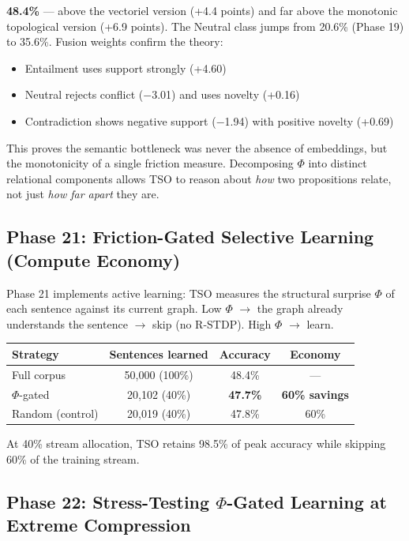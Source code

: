 \documentclass{article}
\begin{document}
\textbf{48.4\%} --- above the vectoriel version (+4.4 points) and far above the monotonic topological version (+6.9 points). The Neutral class jumps from 20.6\% (Phase 19) to 35.6\%. Fusion weights confirm the theory:

\begin{itemize}
    \item Entailment uses support strongly (+4.60)
    \item Neutral rejects conflict ($-$3.01) and uses novelty (+0.16)
    \item Contradiction shows negative support ($-$1.94) with positive novelty (+0.69)
\end{itemize}

This proves the semantic bottleneck was never the absence of embeddings, but the monotonicity of a single friction measure. Decomposing $\Phi$ into distinct relational components allows TSO to reason about \textit{how} two propositions relate, not just \textit{how far apart} they are.

\subsection{Phase 21: Friction-Gated Selective Learning (Compute Economy)}

Phase 21 implements active learning: TSO measures the structural surprise $\Phi$ of each sentence against its current graph. Low $\Phi$ $\to$ the graph already understands the sentence $\to$ skip (no R-STDP). High $\Phi$ $\to$ learn.

\begin{center}
\begin{tabular}{lccc}
\toprule
Strategy & Sentences learned & Accuracy & Economy \\
\midrule
Full corpus & 50,000 (100\%) & 48.4\% & --- \\
$\Phi$-gated & 20,102 (40\%) & \textbf{47.7\%} & \textbf{60\% savings} \\
Random (control) & 20,019 (40\%) & 47.8\% & 60\% \\
\bottomrule
\end{tabular}
\end{center}

At 40\% stream allocation, TSO retains 98.5\% of peak accuracy while skipping 60\% of the training stream.

\subsection{Phase 22: Stress-Testing $\Phi$-Gated Learning at Extreme Compression}
\end{document}
